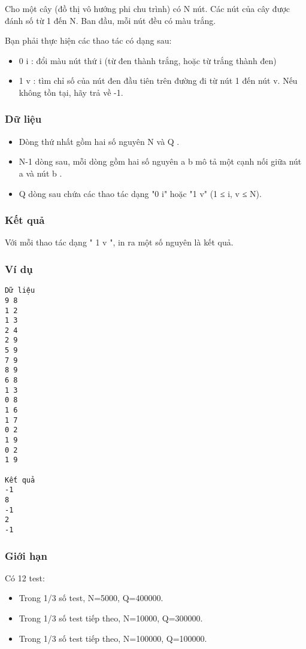 

Cho một cây (đồ thị vô hướng phi chu trình) có N nút. Các nút của cây được đánh số từ 1 đến N. Ban đầu, mỗi nút đều có màu trắng.

Bạn phải thực hiện các thao tác có dạng sau:
\begin{itemize}
	\item 0 i : đổi màu nút thứ i (từ đen thành trắng, hoặc từ trắng thành đen)
	\item 1 v : tìm chỉ số của nút đen đầu tiên trên đường đi từ nút 1 đến nút v. Nếu không tồn tại, hãy trả về -1.
\end{itemize}

\subsubsection{Dữ liệu}
\begin{itemize}
	\item Dòng thứ nhất gồm hai số nguyên N và Q .
	\item N-1 dòng sau, mỗi dòng gồm hai số nguyên a b mô tả một cạnh nối giữa nút a và nút b .
	\item Q dòng sau chứa các thao tác dạng "0 i" hoặc "1 v" (1 ≤ i, v ≤ N).
\end{itemize}

\subsubsection{Kết quả}

Với mỗi thao tác dạng " 1 v ", in ra một số nguyên là kết quả.

\subsubsection{Ví dụ}
\begin{verbatim}
Dữ liệu
9 8
1 2
1 3
2 4
2 9
5 9
7 9
8 9
6 8
1 3
0 8
1 6
1 7
0 2
1 9
0 2
1 9 

Kết quả
-1
8
-1
2
-1
\end{verbatim}

\subsubsection{Giới hạn}

Có 12 test:
\begin{itemize}
	\item Trong 1/3 số test, N=5000, Q=400000.
	\item Trong 1/3 số test tiếp theo, N=10000, Q=300000.
	\item Trong 1/3 số test tiếp theo, N=100000, Q=100000.
\end{itemize}